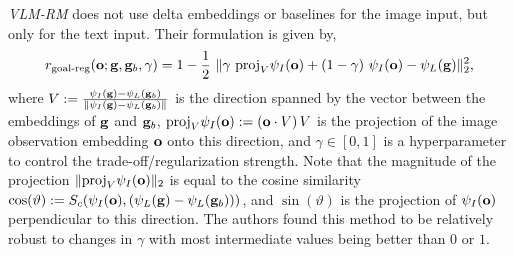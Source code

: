 \emph{VLM-RM} does not use delta embeddings or baselines for the image input, but only for the text input.
Their formulation is given by,
\begin{equation}
    \label{eq:vlmrm}
    r_{\text{goal-reg}}(\bfo; \bfg, \bfg_b, \gamma) = 1 - \dfrac{1}{2}\ \norm{\gamma\ \text{proj}_{V}\psi_I(\bfo) + (1 - \gamma)\ \psi_I(\bfo) - \psi_L(\bfg)}^2_2,
\end{equation}
where \(V := \frac{\psi_I(\mathbf{g}) - \psi_L(\mathbf{g}_b)}{\lVert\psi_I(\mathbf{g}) - \psi_L(\mathbf{g}_b)\rVert}\) is the direction spanned by the vector between the embeddings of \(\mathbf{g}\) and \(\mathbf{g}_b\), \(\text{proj}_{V}\psi_I(\mathbf{o}) := (\mathbf{o} \cdot V)\,V\) is the projection of the image observation embedding \(\mathbf{o}\) onto this direction, and \(\gamma \in [0, 1]\) is a hyperparameter to control the trade-off/regularization strength.
Note that the magnitude of the projection \(\lVert\text{proj}_{V}\psi_I(\mathbf{o})\rVert_2\) is equal to the cosine similarity \(\cos(\vartheta) := S_c(\psi_I(\mathbf{o}), (\psi_L(\mathbf{g}) - \psi_L(\mathbf{g}_b)))\), and \(\sin(\vartheta)\) is the projection of \(\psi_I(\mathbf{o})\) perpendicular to this direction.
The authors found this method to be relatively robust to changes in \(\gamma\) with most intermediate values being better than \(0\) or \(1\).
% 
\vspace{-1.5pt}
